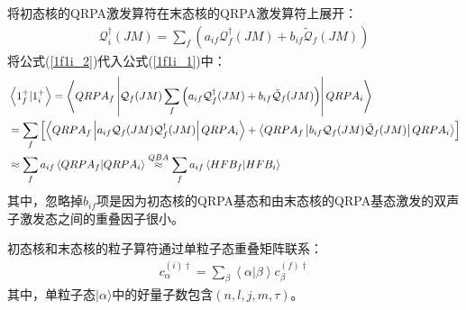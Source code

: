 \documentclass[master]{shnuthesis}
\begin{document}
将初态核的QRPA激发算符在末态核的QRPA激发算符上展开：
\begin{eqnarray}
    \mathcal{Q}_i^\dagger(JM) = \sum_{f} \left( a_{if}\mathcal{Q}_f^\dagger(JM)+b_{if}\tilde{\mathcal{Q}}_f(JM)\right) \label{1f1i_2}
\end{eqnarray}
将公式(\ref{1f1i_2})代入公式(\ref{1f1i_1})中：
\begin{align}
    & \left\langle 1_f^+|1_i^+ \right\rangle = \left\langle QRPA_f\left|\mathcal{Q}_f(JM) \sum_{f} \left( a_{if}\mathcal{Q}_f^\dagger(JM)+b_{if}\tilde{\mathcal{Q}}_f(JM)\right)\right|QRPA_i \right\rangle \notag\\
    & = \sum_{f} \left[\left\langle QRPA_f\left| a_{if}\mathcal{Q}_f(JM)\mathcal{Q}_f^\dagger(JM) \right|QRPA_i \right\rangle + \left\langle QRPA_f\left| b_{if}\mathcal{Q}_f(JM)\tilde{\mathcal{Q}}_f(JM) \right|QRPA_i \right\rangle\right] \notag\\
    & \approx \sum_{f} a_{if} \left\langle QRPA_f|QRPA_i \right\rangle \overset{QBA}{\approx} \sum_{f} a_{if} \left\langle HFB_f|HFB_i \right\rangle
\end{align}
其中，忽略掉$b_{if}$项是因为初态核的QRPA基态和由末态核的QRPA基态激发的双声子激发态之间的重叠因子很小。

初态核和末态核的粒子算符通过单粒子态重叠矩阵联系：
\begin{align}
    c_{\alpha}^{(i)\dagger} = \sum_{\beta} \left\langle \alpha | \beta \right\rangle c_{\beta}^{(f)\dagger}
\end{align}
其中，单粒子态$|\alpha\rangle$中的好量子数包含$(n,l,j,m,\tau)$。
\end{document}
